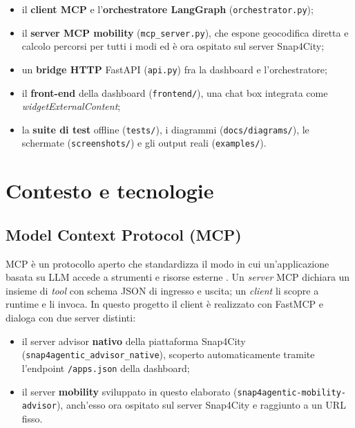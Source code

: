 \documentclass[a4paper,oneside]{Tptesi2}
\begin{document}
\begin{itemize}
  \item il \textbf{client MCP} e l'\textbf{orchestratore LangGraph}
        (\texttt{orchestrator.py});
  \item il \textbf{server MCP mobility} (\texttt{mcp\_server.py}), che espone
        geocodifica diretta e calcolo percorsi per tutti i modi ed \`e ora ospitato
        sul server Snap4City;
  \item un \textbf{bridge HTTP} FastAPI (\texttt{api.py}) fra la dashboard e
        l'orchestratore;
  \item il \textbf{front-end} della dashboard (\texttt{frontend/}), una chat box
        integrata come \emph{widgetExternalContent};
  \item la \textbf{suite di test} offline (\texttt{tests/}), i diagrammi
        (\texttt{docs/diagrams/}), le schermate (\texttt{screenshots/}) e gli output
        reali (\texttt{examples/}).
\end{itemize}

\chapter{Contesto e tecnologie}

\section{Model Context Protocol (MCP)}

MCP \`e un protocollo aperto che standardizza il modo in cui un'applicazione basata su
LLM accede a strumenti e risorse esterne \cite{mcp}. Un \emph{server} MCP dichiara un
insieme di \emph{tool} con schema JSON di ingresso e uscita; un \emph{client} li
scopre a runtime e li invoca. In questo progetto il client \`e realizzato con FastMCP
\cite{fastmcp} e dialoga con due server distinti:

\begin{itemize}
  \item il server advisor \textbf{nativo} della piattaforma Snap4City
        (\texttt{snap4agentic\_advisor\_native}), scoperto automaticamente tramite
        l'endpoint \texttt{/apps.json} della dashboard;
  \item il server \textbf{mobility} sviluppato in questo elaborato
        (\texttt{snap4agentic-mobility-advisor}), anch'esso ora ospitato sul server
        Snap4City e raggiunto a un URL fisso.
\end{itemize}
\end{document}
